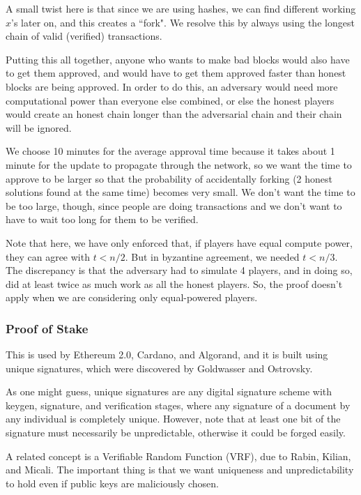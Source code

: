 \documentclass[11pt]{article}
\begin{document}
A small twist here is that since we are using hashes, we can find different working \(x\)'s later on, and this creates a ``fork".
We resolve this by always using the longest chain of valid (verified) transactions.\bigskip

Putting this all together, anyone who wants to make bad blocks would also have to get them approved, and would have to get them approved faster than honest blocks are being approved. In order to do this, an adversary would need more computational power than everyone else combined, or else the honest players would create an honest chain longer than the adversarial chain and their chain will be ignored.

We choose 10 minutes for the average approval time because it takes about 1 minute for the update to propagate through the network, so we want the time to approve to be larger so that the probability of accidentally forking (2 honest solutions found at the same time) becomes very small. 
We don't want the time to be too large, though, since people are doing transactions and we don't want to have to wait too long for them to be verified.\smallskip

Note that here, we have only enforced that, if players have equal compute power, they can agree with \(t<n/2\). But in byzantine agreement, we needed \(t<n/3\).
The discrepancy is that the adversary had to simulate 4 players, and in doing so, did at least twice as much work as all the honest players.
So, the proof doesn't apply when we are considering only equal-powered players.

\subsubsection{Proof of Stake}
This is used by Ethereum 2.0, Cardano, and Algorand, and it is built using unique signatures, which were discovered by Goldwasser and Ostrovsky.

As one might guess, unique signatures are any digital signature scheme with keygen, signature, and verification stages, where any signature of a document by any individual is completely unique.
However, note that at least one bit of the signature must necessarily be unpredictable, otherwise it could be forged easily.\smallskip

A related concept is a Verifiable Random Function (VRF), due to Rabin, Kilian, and Micali. 
The important thing is that we want uniqueness and unpredictability to hold even if public keys are maliciously chosen.\medskip
\end{document}
